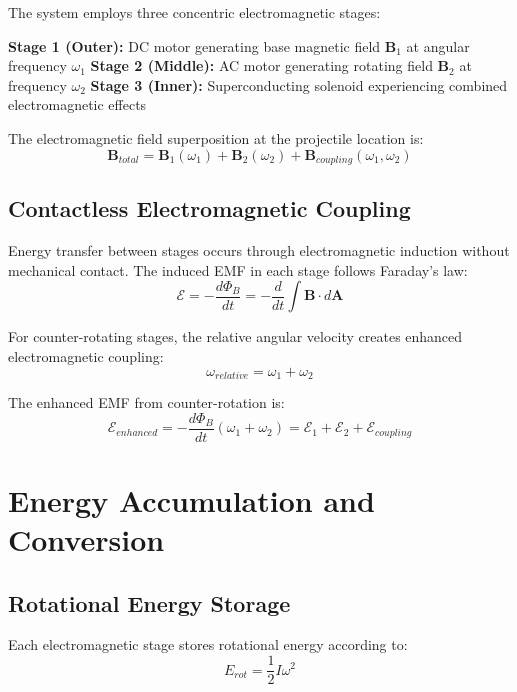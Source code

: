 \documentclass[12pt,a4paper]{article}
\begin{document}
The system employs three concentric electromagnetic stages:

\textbf{Stage 1 (Outer):} DC motor generating base magnetic field $\mathbf{B}_1$ at angular frequency $\omega_1$
\textbf{Stage 2 (Middle):} AC motor generating rotating field $\mathbf{B}_2$ at frequency $\omega_2$  
\textbf{Stage 3 (Inner):} Superconducting solenoid experiencing combined electromagnetic effects

The electromagnetic field superposition at the projectile location is:
\begin{equation}
\mathbf{B}_{total} = \mathbf{B}_1(\omega_1) + \mathbf{B}_2(\omega_2) + \mathbf{B}_{coupling}(\omega_1,\omega_2)
\end{equation}

\subsection{Contactless Electromagnetic Coupling}

Energy transfer between stages occurs through electromagnetic induction without mechanical contact. The induced EMF in each stage follows Faraday's law:
\begin{equation}
\mathcal{E} = -\frac{d\Phi_B}{dt} = -\frac{d}{dt}\int \mathbf{B} \cdot d\mathbf{A}
\end{equation}

For counter-rotating stages, the relative angular velocity creates enhanced electromagnetic coupling:
\begin{equation}
\omega_{relative} = \omega_1 + \omega_2
\end{equation}

The enhanced EMF from counter-rotation is:
\begin{equation}
\mathcal{E}_{enhanced} = -\frac{d\Phi_B}{dt}(\omega_1 + \omega_2) = \mathcal{E}_1 + \mathcal{E}_2 + \mathcal{E}_{coupling}
\end{equation}

\section{Energy Accumulation and Conversion}

\subsection{Rotational Energy Storage}

Each electromagnetic stage stores rotational energy according to:
\begin{equation}
E_{rot} = \frac{1}{2}I\omega^2
\end{equation}
\end{document}
